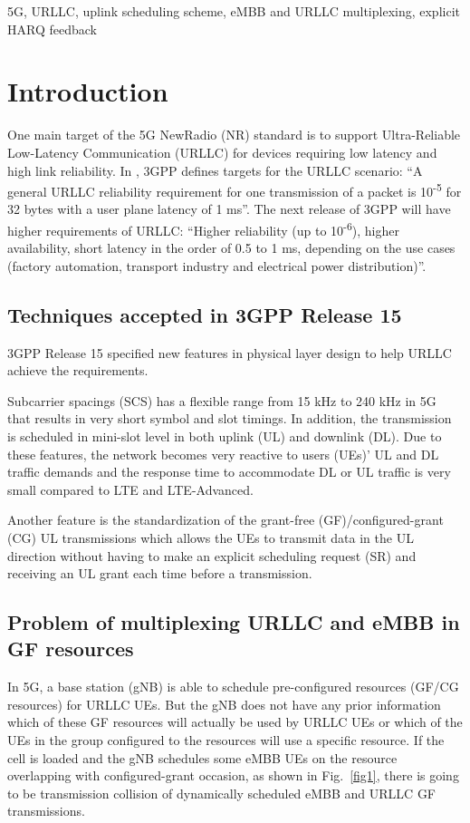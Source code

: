 \documentclass[conference]{IEEEtran}
\begin{document}
\begin{IEEEkeywords}
5G, URLLC, uplink scheduling scheme, eMBB and URLLC multiplexing, explicit HARQ feedback
\end{IEEEkeywords}

\section{Introduction} \label{I}
One main target of the 5G NewRadio (NR) standard is to support Ultra-Reliable Low-Latency Communication (URLLC) for devices requiring low latency and high link reliability. In \cite{b6}, 3GPP defines targets for the URLLC scenario: ``A general URLLC reliability requirement for one transmission of a packet is 10\textsuperscript{-5} for 32 bytes with a user plane latency of 1 ms''. The next release of 3GPP will have higher requirements of URLLC: ``Higher reliability (up to 10\textsuperscript{-6}), higher availability, short latency in the order of 0.5 to 1 ms, depending on the use cases (factory automation, transport industry and electrical power distribution)''\cite{b8}.

\subsection{Techniques accepted in 3GPP Release 15}\label{IAA}
3GPP Release 15 specified new features in physical layer design to help URLLC achieve the requirements.

Subcarrier spacings (SCS) has a flexible range from 15 kHz to 240 kHz in 5G that results in very short symbol and slot timings\cite{ad2}. In addition, the transmission is scheduled in  mini-slot level in both uplink (UL) and downlink (DL)\cite{ad3}. Due to these features, the network becomes very reactive to users (UEs)' UL and DL traffic demands and the response time to accommodate DL or UL traffic is very small compared to LTE and LTE-Advanced.

Another feature is the standardization of the grant-free (GF)/configured-grant (CG) UL transmissions which allows the UEs to transmit data in the UL direction without having to make an explicit scheduling request (SR) and receiving an UL grant each time before a transmission\cite{ad4}.

\subsection{Problem of multiplexing URLLC and eMBB in GF resources}\label{IBB}
In 5G, a base station (gNB) is able to schedule pre-configured resources (GF/CG resources) for URLLC UEs. But the gNB does not have any prior information which of these GF resources will actually be used by URLLC UEs or which of the UEs in the group configured to the resources will use a specific resource. If the cell is loaded and the gNB schedules some eMBB UEs on the resource overlapping with configured-grant occasion, as shown in Fig.~\ref{fig1}, there is going to be transmission collision of dynamically scheduled eMBB and URLLC GF transmissions. 
\end{document}
